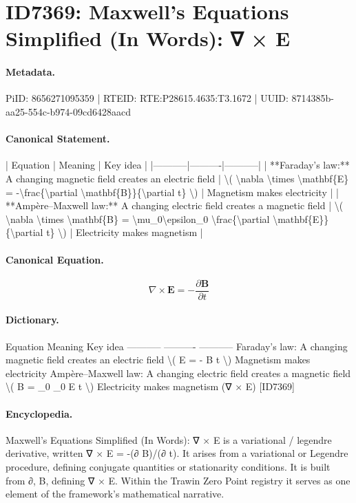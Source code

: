 \section*{ID7369: Maxwell’s Equations Simplified (In Words): ∇ × E}
\paragraph{Metadata.}
PiID: 8656271095359 | RTEID: RTE:P28615.4635:T3.1672 | UUID: 8714385b-aa25-554c-b974-09cd6428aacd

\paragraph{Canonical Statement.}
| Equation | Meaning | Key idea | |-----------|----------|-----------| | **Faraday’s law:** A changing magnetic field creates an electric field | \textbackslash{}( \textbackslash{}nabla \textbackslash{}times \textbackslash{}mathbf\{E\} = -\textbackslash{}frac\{\textbackslash{}partial \textbackslash{}mathbf\{B\}\}\{\textbackslash{}partial t\} \textbackslash{}) | Magnetism makes electricity | | **Ampère–Maxwell law:** A changing electric field creates a magnetic field | \textbackslash{}( \textbackslash{}nabla \textbackslash{}times \textbackslash{}mathbf\{B\} = \textbackslash{}mu\_0\textbackslash{}epsilon\_0 \textbackslash{}frac\{\textbackslash{}partial \textbackslash{}mathbf\{E\}\}\{\textbackslash{}partial t\} \textbackslash{}) | Electricity makes magnetism |

\paragraph{Canonical Equation.}
\[
\nabla \times \mathbf{E} = -\frac{\partial \mathbf{B}}{\partial t}
\]

\paragraph{Dictionary.}
Equation Meaning Key idea ----------- ---------- ----------- Faraday’s law: A changing magnetic field creates an electric field \textbackslash{}( E = - B t \textbackslash{}) Magnetism makes electricity Ampère–Maxwell law: A changing electric field creates a magnetic field \textbackslash{}( B = \_0 \_0 E t \textbackslash{}) Electricity makes magnetism (∇ × E) [ID7369]

\paragraph{Encyclopedia.}
Maxwell’s Equations Simplified (In Words): ∇ × E is a variational / legendre derivative, written ∇ × E = -(∂ B)/(∂ t). It arises from a variational or Legendre procedure, defining conjugate quantities or stationarity conditions. It is built from ∂, B, defining ∇ × E. Within the Trawin Zero Point registry it serves as one element of the framework's mathematical narrative.
